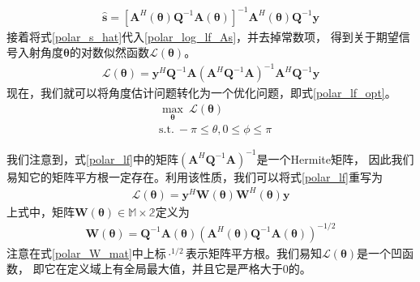 \documentclass[master]{thesis-uestc}
\begin{document}
\begin{equation}\label{polar_s_hat}
    \begin{aligned}
        \hat{\bm{s}}=
        \left[\bm{A}^{H}(\bm{\theta}) \bm{Q}^{-1} \bm{A}(\bm{\theta})\right]^{-1} 
        \bm{A}^{H}(\bm{\theta}) \bm{Q}^{-1} \bm{y}
    \end{aligned}
\end{equation}
接着将式\eqref{polar_s_hat}代入\eqref{polar_log_lf_As}，并去掉常数项，
得到关于期望信号入射角度$\bm{\theta}$的对数似然函数$\mathcal{L}(\bm{\theta})$。
\begin{equation}\label{polar_lf}
    \begin{aligned}
        \mathcal{L}(\bm{\theta})=
        \bm{y}^{H} \bm{Q}^{-1} \bm{A}
        \left(\bm{A}^{H} \bm{Q}^{-1} \bm{A}\right)^{-1} \bm{A}^{H} \bm{Q}^{-1} \bm{y}
    \end{aligned}
\end{equation}
现在，我们就可以将角度估计问题转化为一个优化问题，即式\eqref{polar_lf_opt}。
\begin{equation}\label{polar_lf_opt}
    \begin{aligned}
        &\max_{\bm{\theta}} ~ \mathcal{L}(\bm{\theta}) \\
        &\text{s.t.} ~ -\pi\leqslant\theta, 0\leqslant\phi\leqslant\pi
    \end{aligned}
\end{equation}

我们注意到，式\eqref{polar_lf}中的矩阵$\left(\bm{A}^H\bm{Q}^{-1}\bm{A}\right)^{-1}$是一个Hermite矩阵，
因此我们易知它的矩阵平方根一定存在。利用该性质，我们可以将式\eqref{polar_lf}重写为
\begin{equation}\label{polar_lf_W}
    \begin{aligned}
        \mathcal{L}(\bm{\theta}) = \bm{y}^H\bm{W}(\bm{\theta})\bm{W}^H(\bm{\theta})\bm{y}
    \end{aligned}
\end{equation}
上式中，矩阵$\bm{W}(\bm{\theta})\in\mathbb{M\times2}$定义为
\begin{equation}\label{polar_W_mat}
    \begin{aligned}
        \bm{W}(\bm{\theta}) = \bm{Q}^{-1}\bm{A}(\bm{\theta})
        \left(\bm{A}^H(\bm{\theta})\bm{Q}^{-1}\bm{A}(\bm{\theta})\right)^{-1/2}
    \end{aligned}
\end{equation}
注意在式\eqref{polar_W_mat}中上标$\cdot^{1/2}$表示矩阵平方根。我们易知$\mathcal{L}(\bm{\theta})$是一个凹函数，
即它在定义域上有全局最大值，并且它是严格大于0的。
\end{document}
